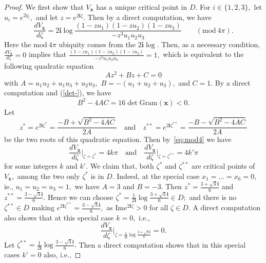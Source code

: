 \documentclass[10pt,a4paper]{amsart}
\begin{document}
\begin{proof} We first show that $V_{\boldsymbol x}$ has a unique  critical point in $D.$  For $i\in\{1,2,3\},$ let $u_i=e^{2y_i},$ and let $z=e^{2\mathbf i\zeta}.$ Then by a direct computation, we have
\begin{equation}\label{eq:mod4}
\frac{d V_{\boldsymbol x}}{d \zeta}=2\mathbf i\log\frac{(1-zu_1)(1-zu_2)(1-zu_3)}{-z^3u_1u_2u_3}\quad\quad (\mathrm{mod}\ 4\pi).
\end{equation} 
Here the $\mathrm{mod}\ 4\pi$ ubiquity  comes from the  $2\mathbf i\log.$ Then, as a necessary condition, $\frac{d V_{\boldsymbol x}}{d \zeta}=0$ implies that 
$\frac{(1-zu_1)(1-zu_2)(1-zu_3)}{-z^3u_1u_2u_3}=1,$ which is equivalent to the following quadratic equation 
$$Az^2+Bz+C=0$$
with $A=u_1u_2+u_1u_3+u_2u_3,$ $B=-(u_1+u_2+u_3),$ and $C=1.$
By a direct computation and (\ref{det-}), we have 
\begin{equation}\label{detGram}
    B^2-4AC = 16\det\mathrm{Gram}(\boldsymbol x)<0.
\end{equation}
Let 
\begin{equation}\label{xi}
z^*=e^{2\mathbf i\zeta^*}=\frac{-B+\sqrt{B^2-4AC}}{2A}\quad\text{and}\quad {z^{**}}=e^{2\mathbf i{\zeta^{**}}}=\frac{-B-\sqrt{B^2-4AC}}{2A}
\end{equation}
be the two roots of this quadratic equation. Then by~\eqref{eq:mod4} we have 
\begin{equation}\label{kk'}
    \frac{d V_{\boldsymbol x}}{d \zeta}\Big|_{\zeta=\zeta^*}=4k\pi\quad\text{and}\quad\frac{d V_{\boldsymbol x}}{d \zeta}\Big|_{\zeta={\zeta^{**}}}=4k'\pi
\end{equation}
for some integers $k$ and $k'.$ We claim that, both $\zeta^*$ and $\zeta^{**}$ are  critical points of $V_{\boldsymbol x},$ among the two only $\zeta^*$ is in $D.$   Indeed, at the special case $x_1=\dots=x_6=0,$ ie., $u_1=u_2=u_3=1,$ we have 
$A=3$ and $B=-3.$ Then $z^*=\frac{3+\sqrt{3}\mathbf i}{6}$ and ${z^{**}}=\frac{3-\sqrt{3}\mathbf i}{6}.$ Hence we can choose $\zeta^*=\frac{1}{2\mathbf i}\log \frac{3+\sqrt{3}\mathbf i}{6}\in D;$ and  there is no ${\zeta^{**}}\in D$ making $e^{2\mathbf i{\zeta^{**}}}=\frac{3-\sqrt{3}\mathbf i}{6},$ as $\mathrm{Im}e^{2\mathbf i\zeta}>0$ for all $\zeta\in D.$ A direct computation also shows that at this special case $k=0,$ i.e.,
$$\frac{d V_{\boldsymbol x}}{d\zeta}\Big|_{\zeta=\frac{1}{2\mathbf i}\log \frac{3+\sqrt{3}\mathbf i}{6}}=0.$$ 
Let $\zeta^{**}=\frac{1}{2\mathbf i}\log \frac{3-\sqrt{3}\mathbf i}{6}.$ Then a direct computation shows that  in this special cases $k'=0$ also, i.e.,

\end{proof}
\end{document}
